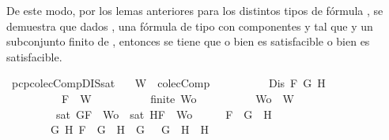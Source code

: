 \begin{isabellebody}
\isamarkupfalse%
%
\endisatagproof
{\isafoldproof}%
%
\isadelimproof
%
\endisadelimproof
%
\begin{isamarkuptext}%
De este modo, por los lemas anteriores para los distintos tipos de fórmula \isa{{\isasymbeta}}, se
  demuestra que dados ,  una fórmula de tipo \isa{{\isasymbeta}} con componentes  y  tal que 
   y  un subconjunto finito de , entonces se tiene que o bien  es 
  satisfacible o bien  es satisfacible.%
\end{isamarkuptext}\isamarkuptrue%
\isamarkupfalse%
\ pcp{\isacharunderscore}colecComp{\isacharunderscore}DIS{\isacharunderscore}sat{\isacharcolon}\isanewline
\ \ \ {\isachardoublequoteopen}W\ {\isasymin}\ colecComp{\isachardoublequoteclose}\isanewline
\ \ \ \ \ \ \ \ \ \ {\isachardoublequoteopen}Dis\ F\ G\ H{\isachardoublequoteclose}\isanewline
\ \ \ \ \ \ \ \ \ \ {\isachardoublequoteopen}F\ {\isasymin}\ W{\isachardoublequoteclose}\isanewline
\ \ \ \ \ \ \ \ \ \ {\isachardoublequoteopen}finite\ Wo{\isachardoublequoteclose}\isanewline
\ \ \ \ \ \ \ \ \ \ {\isachardoublequoteopen}Wo\ {\isasymsubseteq}\ W{\isachardoublequoteclose}\isanewline
\ \ \ \ \ \ \ \ \ {\isachardoublequoteopen}sat\ {\isacharparenleft}{\isacharbraceleft}G{\isacharcomma}F{\isacharbraceright}\ {\isasymunion}\ Wo{\isacharparenright}\ {\isasymor}\ sat\ {\isacharparenleft}{\isacharbraceleft}H{\isacharcomma}F{\isacharbraceright}\ {\isasymunion}\ Wo{\isacharparenright}{\isachardoublequoteclose}\isanewline
%
\isadelimproof
%
\endisadelimproof
%
\isatagproof
{}\isamarkupfalse%
\ {\isacharminus}\isanewline
\ \ \isamarkupfalse%
\ {\isachardoublequoteopen}{\isacharparenleft}F\ {\isacharequal}\ G\ \isactrlbold {\isasymor}\ H\ {\isasymor}\ \isanewline
\ \ \ \ \ \ \ \ {\isacharparenleft}{\isasymexists}G{}\ H{}{\isachardot}\ F\ {\isacharequal}\ G{}\ \isactrlbold {\isasymrightarrow}\ H{}\ {\isasymand}\ G\ {\isacharequal}\ \isactrlbold {\isasymnot}\ G{}\ {\isasymand}\ H\ {\isacharequal}\ H{}{\isacharparenright}\ {\isasymor}\ \isanewline

\end{isabellebody}
